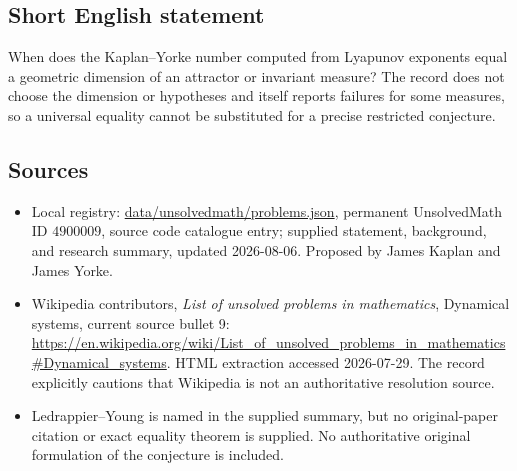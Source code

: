 \documentclass[11pt]{article}
\begin{document}
\subsection{Short English statement}
When does the Kaplan--Yorke number computed from Lyapunov exponents equal a geometric dimension of an attractor or invariant measure? The record does not choose the dimension or hypotheses and itself reports failures for some measures, so a universal equality cannot be substituted for a precise restricted conjecture.
\subsection{Sources}
\begin{itemize}
\item Local registry: \url{data/unsolvedmath/problems.json}, permanent UnsolvedMath ID \(4900009\), source code catalogue entry; supplied statement, background, and research summary, updated 2026-08-06. Proposed by James Kaplan and James Yorke.
\item Wikipedia contributors, \emph{List of unsolved problems in mathematics}, Dynamical systems, current source bullet 9: \url{https://en.wikipedia.org/wiki/List_of_unsolved_problems_in_mathematics#Dynamical_systems}. HTML extraction accessed 2026-07-29. The record explicitly cautions that Wikipedia is not an authoritative resolution source.
\item Ledrappier--Young is named in the supplied summary, but no original-paper citation or exact equality theorem is supplied. No authoritative original formulation of the conjecture is included.
\end{itemize}
\end{document}
